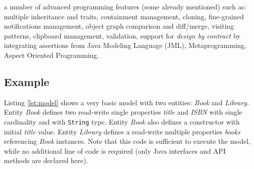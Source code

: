  a number of advanced programming features (some already mentioned) such as:  multiple inheritance and traits, containment management, cloning, fine-grained notifications management, object graph comparison and diff/merge, visiting patterns, clipboard management, validation, support for \emph{design by contract} by integrating assertions from Java Modeling Language (JML), Metaprogramming, Aspect Oriented Programming. 



\subsection{Example}

Listing \ref{lst:model} shows a very basic model with two entities: \emph{Book} and \emph{Library}. Entity \emph{Book} defines two read-write single properties \emph{title} and \emph{ISBN} with single cardinality and with \texttt{String} type. Entity \emph{Book} also defines a constructor with initial \emph{title} value. Entity \emph{Library} defines a read-write multiple properties \emph{books} referencing \emph{Book} instances. Note that this code is sufficient to execute the model, while no additional line of code is required (only Java interfaces and API methods are declared here). 

